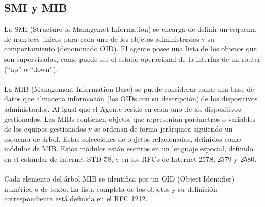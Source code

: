 \documentclass[letterpaper]{article}
\begin{document}
\subsection{SMI y MIB} %
\label{sub:objgen}
La SMI (Structure of Managemet Information) se encarga de definir un esquema
de nombres únicos para cada uno de los objetos administrados y su comportamiento
(denominado OID). El agente posee una lista de los objetos que son supervisados, como
puede ser el estado operacional de la interfaz de un router (“up” o “down”).\\\\
La MIB (Management Information Base) se puede considerar como una base de
datos que almacena información (los OIDs con su descripción) de los dispositivos
administrados. Al igual que el Agente reside en cada uno de los dispositivos
gestionados. Las MIBs contienen objetos que representan parámetros o variables de los
equipos gestionados y se ordenan de forma jerárquica siguiendo un esquema de árbol.
Estas colecciones de objetos relacionados, definidos como módulos de MIB. Estos
módulos están escritos en un lenguaje especial, definido en el estándar de Internet STD
58, y en los RFCs de Internet 2578, 2579 y 2580.\\\\
Cada elemento del árbol MIB se identifica por un OID (Object Identifier)
numérico o de texto. La lista completa de los objetos y su definición
correspondiente está definida en el RFC 1212.\\\\
\end{document}
